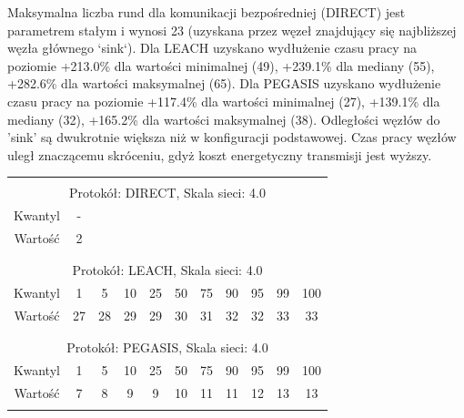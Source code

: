 \documentclass[a4paper,12pt,twoside,openany]{report}
\begin{document}
\par
Maksymalna liczba rund dla komunikacji bezpośredniej (DIRECT) jest parametrem stałym i wynosi 23 (uzyskana przez węzeł znajdujący się najbliższej węzła głównego `sink`).
Dla LEACH uzyskano wydłużenie czasu pracy na poziomie +213.0\% dla wartości minimalnej (49), +239.1\% dla mediany (55), +282.6\% dla wartości maksymalnej (65).
Dla PEGASIS uzyskano wydłużenie czasu pracy na poziomie +117.4\% dla wartości minimalnej (27), +139.1\% dla mediany (32), +165.2\% dla wartości maksymalnej (38).
Odległości węzłów do 'sink' są dwukrotnie większa niż w konfiguracji podstawowej. Czas pracy węzłów uległ znaczącemu skróceniu, gdyż koszt energetyczny transmisji jest wyższy.

\begin{longtable}{*{11}{c}}
\toprule \\*
\multicolumn{11}{c}{Protokół: DIRECT, Skala sieci: 4.0} \\*
Kwantyl	& -	\\*
Wartość	& 2	\\*
\midrule \\*
\\*
\multicolumn{11}{c}{Protokół: LEACH, Skala sieci: 4.0} \\*
Kwantyl	& 1	& 5	& 10	& 25	& 50	& 75	& 90	& 95	& 99	& 100	\\*
Wartość	& 27	& 28	& 29	& 29	& 30	& 31	& 32	& 32	& 33	& 33	\\*
\midrule \\*
\\*
\multicolumn{11}{c}{Protokół: PEGASIS, Skala sieci: 4.0} \\*
Kwantyl	& 1	& 5	& 10	& 25	& 50	& 75	& 90	& 95	& 99	& 100	\\*
Wartość	& 7	& 8	& 9	& 9	& 10	& 11	& 11	& 12	& 13	& 13	\\*	
\bottomrule \\*
\end{longtable}
\end{document}
